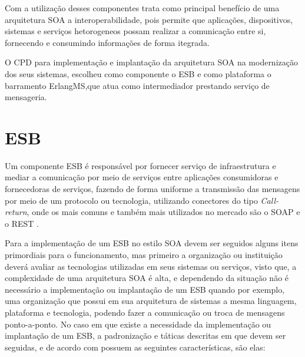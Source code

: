 Com a utilização desses componentes \cite{bass2003software} trata como principal benefício de uma arquitetura \acrshort{SOA} a interoperabilidade, pois permite que aplicações, dispositivos, sistemas e serviços hetorogeneos possam realizar a comunicação entre si, fornecendo e consumindo informações  de forma itegrada. 

O \acrshort{CPD} para implementação e implantação da arquitetura \acrshort{SOA} na modernização dos seus sistemas, escolheu como componente o \acrshort{ESB} e como plataforma o barramento ErlangMS\cite{Agilar},que atua como intermediador prestando serviço de mensageria.


\section{ESB}

Um componente \acrshort{ESB} é responsável por fornecer serviço de infraestrutura e mediar a comunicação por meio de serviços entre aplicações consumidoras e fornecedoras de serviços, fazendo de forma uniforme a transmissão das mensagens por meio de um protocolo ou tecnologia, utilizando conectores do tipo \textit{Call-return}, onde os mais comuns e também mais utilizados no mercado são o \acrshort{SOAP} e o \acrshort{REST}  	 \cite{clements2002documenting}.

Para a implementação de um \acrshort{ESB} no estilo \acrshort{SOA} devem ser seguidos alguns itens primordiais para o funcionamento, mas primeiro a organização ou instituição deverá avaliar as tecnologias utilizadas em seus sistemas ou serviços, visto que, a complexidade de uma arquitetura \acrshort{SOA} é alta, e dependendo da situação não é necessário a implementação ou implantação de um \acrshort{ESB} quando por exemplo, uma organização que  possui em sua arquitetura de sistemas a mesma linguagem, plataforma e tecnologia, podendo fazer a comunicação ou troca de mensagens ponto-a-ponto\cite{bianco2011architecting}. No caso em que existe a necessidade da implementação ou implantação de um \acrshort{ESB}, a padronização e táticas descritas em \cite{bianco2011architecting} que devem ser seguidas, e de acordo com \cite{erl2009soa} possuem as seguintes características, são elas:


